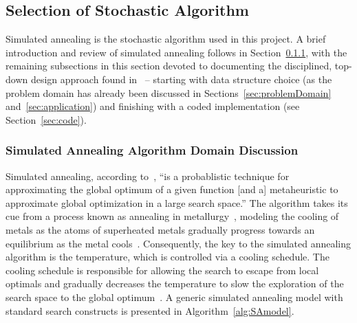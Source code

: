 \documentclass[conference]{IEEEtran}
\begin{document}
\subsection{Selection of Stochastic Algorithm}

Simulated annealing is the stochastic algorithm used in this project. A brief
introduction and review of simulated annealing follows in
Section~\ref{sec:SAD}, with the remaining subsections in this section devoted
to documenting the disciplined, top-down design approach found
in~\cite{lamontMIS, lamontDesign, lamontSCP} -- starting with data structure
choice (as the problem domain has already been discussed in
Sections~\ref{sec:problemDomain} and~\ref{sec:application}) and finishing with
a coded implementation (see Section~\ref{sec:code}).

\subsubsection{Simulated Annealing Algorithm Domain Discussion} \label{sec:SAD}

Simulated annealing, according to~\cite{wiki:SA}, ``is a probablistic technique
for approximating the global optimum of a given function [and a] metaheuristic
to approximate global optimization in a large search space.'' The algorithm
takes its cue from a process known as annealing in metallurgy~\cite{lamontSA},
modeling the cooling of metals as the atoms of superheated metals gradually
progress towards an equilibrium as the metal cools~\cite{talbi2009,
wiki:metal}.  Consequently, the key to the simulated annealing algorithm is the
temperature, which is controlled via a cooling schedule. The cooling schedule
is responsible for allowing the search to escape from local optimals and
gradually decreases the temperature to slow the exploration of the search space
to the global optimum~\cite{lamontSA, talbi2009}. A generic simulated annealing
model with standard search constructs is presented in
Algorithm~\ref{alg:SAmodel}.
\end{document}
